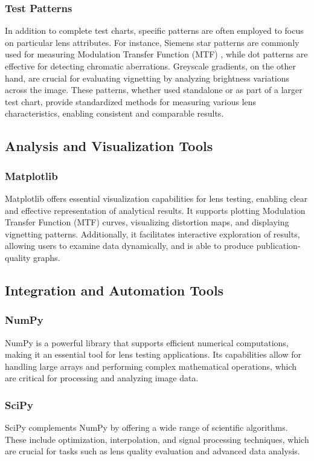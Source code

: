 \subsubsection{Test Patterns}  
In addition to complete test charts, specific patterns are often employed to focus on particular lens attributes. For instance, Siemens star patterns are commonly used for measuring Modulation Transfer Function (MTF) \cite{siemens_star}, while dot patterns are effective for detecting chromatic aberrations. Greyscale gradients, on the other hand, are crucial for evaluating vignetting by analyzing brightness variations across the image. These patterns, whether used standalone or as part of a larger test chart, provide standardized methods for measuring various lens characteristics, enabling consistent and comparable results.

\subsection{Analysis and Visualization Tools}

\subsubsection{Matplotlib}  
Matplotlib offers essential visualization capabilities for lens testing, enabling clear and effective representation of analytical results. It supports plotting Modulation Transfer Function (MTF) curves, visualizing distortion maps, and displaying vignetting patterns. Additionally, it facilitates interactive exploration of results, allowing users to examine data dynamically, and is able to produce publication-quality graphs.

\subsection{Integration and Automation Tools}

\subsubsection{NumPy}  
NumPy is a powerful library that supports efficient numerical computations, making it an essential tool for lens testing applications. Its capabilities allow for handling large arrays and performing complex mathematical operations, which are critical for processing and analyzing image data.

\subsubsection{SciPy}  
SciPy complements NumPy by offering a wide range of scientific algorithms. These include optimization, interpolation, and signal processing techniques, which are crucial for tasks such as lens quality evaluation and advanced data analysis.


